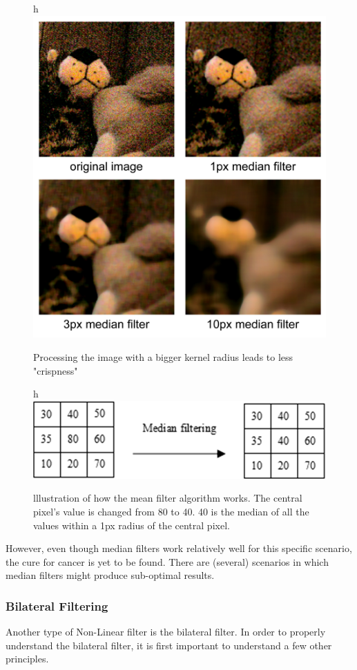 \documentclass[twoside,a4paper,article]{combine}
\begin{document}
\begin{figure}{h}
    \centering
    \includegraphics[width=0.75\linewidth]{median_example.jpg}
    \caption{Processing the image with a bigger kernel radius leads to less "crispness"}
    \label{fig:enter-label}
\end{figure}
\begin{figure}{h}
    \centering
    \includegraphics[width=1\linewidth]{medianfiltering.PNG}
    \caption{lllustration of how the mean filter algorithm works. The central pixel's value is changed from 80 to 40. 40 is the median of all the values within a 1px radius of the central pixel.}
    \label{fig:enter-label}
\end{figure}
However, even though median filters work relatively well for this specific scenario, the cure for cancer is yet to be found. There are (several) scenarios in which median filters might produce sub-optimal results.

\subsubsection{Bilateral Filtering}
Another type of Non-Linear filter is the bilateral filter. In order to properly understand the bilateral filter, it is first important to understand a few other principles.
\end{document}
